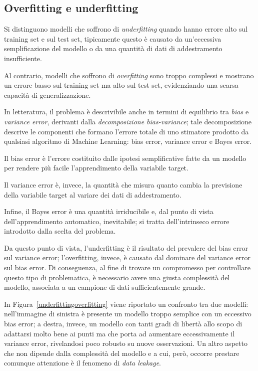 \documentclass[12pt]{report}
\theoremstyle{definition}
\begin{document}
\subsection{Overfitting e underfitting}
Si distinguono modelli che soffrono di \textit{underfitting} quando hanno errore alto sul training set e sul test set, tipicamente questo è causato da un'eccessiva semplificazione del modello o da una quantità di dati di addestramento insufficiente.

Al contrario, modelli che soffrono di \textit{overfitting} sono troppo complessi e mostrano un errore basso sul training set ma alto sul test set, evidenziando una scarsa capacità di generalizzazione.

In letteratura, il problema è descrivibile anche in termini di equilibrio tra \textit{bias} e \textit{variance error}, derivanti dalla \textit{decomposizione bias-variance}; tale decomposizione descrive le componenti che formano l'errore totale di uno stimatore prodotto da qualsiasi algoritmo di Machine Learning: bias error, variance error e Bayes error.

Il bias error è l'errore costituito dalle ipotesi semplificative fatte da un modello per rendere più facile l'apprendimento della variabile target.

Il variance error è, invece, la quantità che misura quanto cambia la previsione della variabile target al variare dei dati di addestramento.

Infine, il Bayes error è una quantità irriducibile e, dal punto di vista dell'apprendimento automatico, inevitabile; si tratta dell'intrinseco errore introdotto dalla scelta del problema.

Da questo punto di vista, l'underfitting è il risultato del prevalere del bias error sul variance error; l'overfitting, invece, è causato dal dominare del variance error sul bias error.
Di conseguenza, al fine di trovare un compromesso per controllare questo tipo di problematica, è necessario avere una giusta complessità del modello, associata a un campione di dati sufficientemente grande.

In Figura~\ref{underfittingoverfitting} viene riportato un confronto tra due modelli: nell'immagine di sinistra è presente un modello troppo semplice con un eccessivo bias error; a destra, invece, un modello con tanti gradi di libertà allo scopo di adattarsi molto bene ai punti ma che porta ad aumentare eccessivamente il variance error, rivelandosi poco robusto su nuove osservazioni. 
Un altro aspetto che non dipende dalla complessità del modello e a cui, però, occorre prestare comunque attenzione è il fenomeno di \textit{data leakage}.
\end{document}
